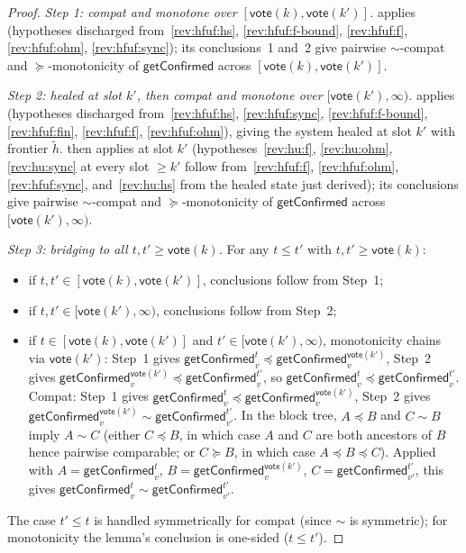 \ifx\litemode\undefined\documentclass{article}\fi
\newcommand{\vote}{\ensuremath{\mathsf{vote}}}
\newcommand{\comm}[1]{\ensuremath{\widetilde{#1}}}
\newcommand{\getConfirmed}{\textsf{getConfirmed}\xspace}
\theoremstyle{plain}
\theoremstyle{definition}
\theoremstyle{remark}
\begin{document}
\begin{proof}
\emph{Step 1: compat and monotone over $[\vote(k), \vote(k')]$.}
 applies (hypotheses discharged from~\ref{rev:hfuf:hs}, \ref{rev:hfuf:f-bound}, \ref{rev:hfuf:f}, \ref{rev:hfuf:ohm}, \ref{rev:hfuf:sync}); its conclusions~1 and~2 give pairwise $\sim$-compat and $\succeq$-monotonicity of $\getConfirmed$ across $[\vote(k), \vote(k')]$.

\emph{Step 2: healed at slot $k'$, then compat and monotone over $[\vote(k'), \infty)$.}
 applies (hypotheses discharged from~\ref{rev:hfuf:hs}, \ref{rev:hfuf:sync}, \ref{rev:hfuf:f-bound}, \ref{rev:hfuf:fin}, \ref{rev:hfuf:f}, \ref{rev:hfuf:ohm}), giving the system healed at slot $k'$ with frontier $\comm{h}$.
 then applies at slot $k'$ (hypotheses~\ref{rev:hu:f}, \ref{rev:hu:ohm}, \ref{rev:hu:sync} at every slot $\geq k'$ follow from~\ref{rev:hfuf:f}, \ref{rev:hfuf:ohm}, \ref{rev:hfuf:sync}, and~\ref{rev:hu:hs} from the healed state just derived);
its conclusions give pairwise $\sim$-compat and $\succeq$-monotonicity of $\getConfirmed$ across $[\vote(k'), \infty)$.

\emph{Step 3: bridging to all $t, t' \geq \vote(k)$.}
For any $t \leq t'$ with $t, t' \geq \vote(k)$:
\begin{itemize}
  \item if $t, t' \in [\vote(k), \vote(k')]$, conclusions follow from Step~1;
  \item if $t, t' \in [\vote(k'), \infty)$, conclusions follow from Step~2;
  \item if $t \in [\vote(k), \vote(k')]$ and $t' \in [\vote(k'), \infty)$, monotonicity chains via $\vote(k')$:
    Step~1 gives $\getConfirmed_v^t \preceq \getConfirmed_v^{\vote(k')}$, Step~2 gives $\getConfirmed_v^{\vote(k')} \preceq \getConfirmed_v^{t'}$, so $\getConfirmed_v^t \preceq \getConfirmed_v^{t'}$.
    Compat: Step~1 gives $\getConfirmed_v^t \preceq \getConfirmed_v^{\vote(k')}$, Step~2 gives $\getConfirmed_v^{\vote(k')} \sim \getConfirmed_{v'}^{t'}$. In the block tree, $A \preceq B$ and $C \sim B$ imply $A \sim C$ (either $C \preceq B$, in which case $A$ and $C$ are both ancestors of $B$ hence pairwise comparable; or $C \succeq B$, in which case $A \preceq B \preceq C$). Applied with $A = \getConfirmed_v^t$, $B = \getConfirmed_v^{\vote(k')}$, $C = \getConfirmed_{v'}^{t'}$, this gives $\getConfirmed_v^t \sim \getConfirmed_{v'}^{t'}$.
\end{itemize}
The case $t' \leq t$ is handled symmetrically for compat (since $\sim$ is symmetric); for monotonicity the lemma's conclusion is one-sided ($t \leq t'$).
\end{proof}
\end{document}

